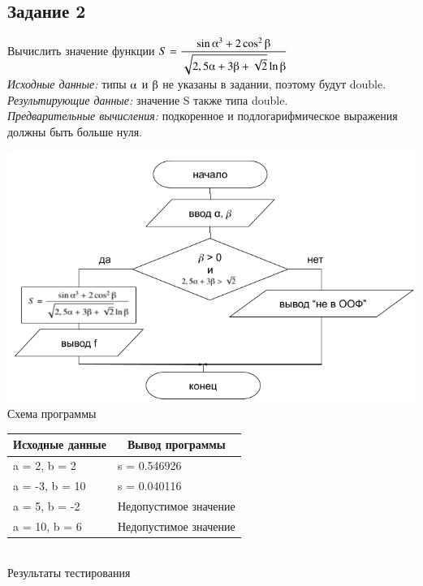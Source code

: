 \documentclass[a4paper,14pt]{extarticle}
\begin{document}
\subsection{Задание 2}
Вычислить значение функции
$S = \displaystyle\frac{ \sin \alphaup^3 + 2\cos^2\betaup }{\sqrt{2,5\alphaup + 3\betaup  + \sqrt{2}}\ln \betaup }$\\
\textit{Исходные данные:} типы $\alphaup$ и $\betaup$ не указаны в задании, поэтому будут double.\\
\textit{Результирующие данные:} значение S также типа double.\\
\textit{Предварительные вычисления:} подкоренное и подлогарифмическое выражения должны быть больше нуля.\\
\vspace{0.5cm}
\begin{center}
\includegraphics[scale=0.6]{lab2-2.png}
Схема программы
\end{center}

\begin{center}
\begin{tabular}{|l|l|}
\hline
\multicolumn{1}{|c|}{Исходные данные}& \multicolumn{1}{|c|}{Вывод программы}\\
\hline
a = 2, b = 2 & s = 0.546926\\
a = -3, b = 10 & s = 0.040116\\
a = 5, b = -2 & Недопустимое значение\\
a = 10, b = 6 & Недопустимое значение\\
\hline
\end{tabular}\\
\vspace{0.3cm}
Результаты тестирования
\end{center}
\end{document}

